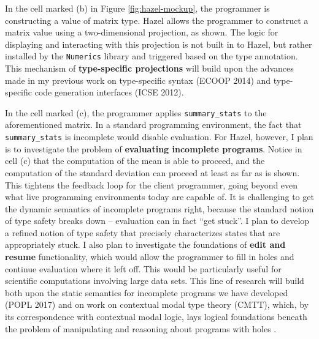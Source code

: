 \documentclass[9pt]{extarticle}
\let\li\lstinline
\begin{document}
In the cell marked (b) in Figure \ref{fig:hazel-mockup}, the programmer is constructing a value of matrix type. Hazel allows the programmer to construct a matrix value using a {two-dimensional projection}, as shown. The logic for displaying and interacting with this projection is not built in to Hazel, but rather installed by the \li{Numerics} library and triggered based on the type annotation. This mechanism of \textbf{type-specific projections} will build upon the advances made in my previous work on type-specific syntax (ECOOP 2014) and type-specific code generation interfaces (ICSE 2012).%

In the cell marked (c), the programmer applies \li{summary_stats} to the aforementioned matrix. In a standard programming environment, the fact that \li{summary_stats} is incomplete would disable evaluation. For Hazel, however, I plan is to investigate the problem of \textbf{evaluating incomplete programs}. Notice in cell (c) that the computation of the mean is able to proceed, and the computation of the standard deviation can proceed at least as far as is shown. This tightens the feedback loop for the client programmer, going beyond even what live programming environments today are capable of. It is challenging to get the dynamic semantics of incomplete programs right, because the standard notion of type safety breaks down -- evaluation can in fact ``get stuck''. I plan to develop a refined notion of type safety that precisely characterizes states that are appropriately stuck. I also plan to investigate the foundations of \textbf{edit and resume} functionality, which would allow the programmer to fill in holes and continue evaluation where it left off. This would be particularly useful for scientific computations involving large data sets. This line of research will build both upon the static semantics for incomplete programs we have developed (POPL 2017) and on work on contextual modal type theory (CMTT), which, by its correspondence with contextual modal logic, lays logical foundations beneath the problem of manipulating and reasoning about programs with holes \cite{Nanevski2008}.
\end{document}
